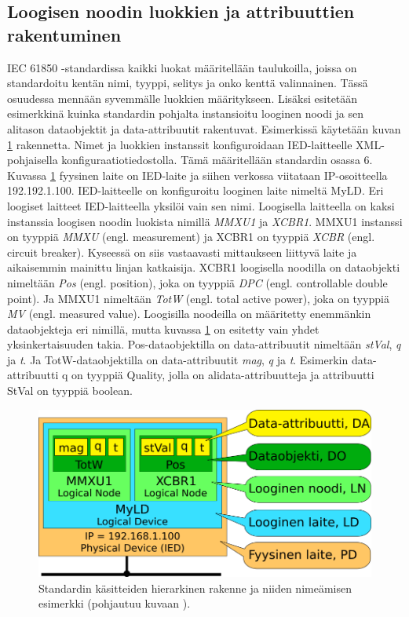 \subsection{Loogisen noodin luokkien ja attribuuttien rakentuminen}
\label{ch:luokkien-rakentuminen-instanseista}
IEC 61850 -standardissa kaikki luokat määritellään taulukoilla, joissa on standardoitu kentän nimi, tyyppi, selitys ja onko kenttä valinnainen. Tässä osuudessa mennään syvemmälle luokkien määritykseen. Lisäksi esitetään esimerkkinä kuinka standardin pohjalta instansioitu looginen noodi ja sen alitason dataobjektit ja data-attribuutit rakentuvat. Esimerkissä käytetään kuvan \ref{fig:iec61850-data-modeling} rakennetta. Nimet ja luokkien instanssit konfiguroidaan IED-laitteelle XML-pohjaisella konfiguraatiotiedostolla. Tämä määritellään standardin osassa 6. Kuvassa \ref{fig:iec61850-data-modeling} fyysinen laite on IED-laite ja siihen verkossa viitataan IP-osoitteella 192.192.1.100. IED-laitteelle on konfiguroitu looginen laite nimeltä MyLD. Eri loogiset laitteet IED-laitteella yksilöi vain sen nimi. Loogisella laitteella on kaksi instanssia loogisen noodin luokista nimillä \emph{MMXU1} ja \emph{XCBR1}. MMXU1 instanssi on tyyppiä \emph{MMXU} (engl. measurement) \mbox{\cite[s.~57--58]{IEC61850-7-4}} ja XCBR1 on tyyppiä \emph{XCBR} (engl. circuit breaker). Kyseessä on siis vastaavasti mittaukseen liittyvä laite ja aikaisemmin mainittu linjan katkaisija. XCBR1 loogisella noodilla on dataobjekti nimeltään \emph{Pos} (engl. position), joka on tyyppiä \emph{DPC} (engl. controllable double point). Ja MMXU1 nimeltään \emph{TotW} (engl. total active power), joka on tyyppiä \emph{MV} (engl. measured value). Loogisilla noodeilla on määritetty enemmänkin dataobjekteja eri nimillä, mutta kuvassa \ref{fig:iec61850-data-modeling} on esitetty vain yhdet yksinkertaisuuden takia. Pos-dataobjektilla on data-attribuutit nimeltään \emph{stVal}, \emph{q} ja \emph{t}. Ja TotW-dataobjektilla on data-attribuutit \emph{mag}, \emph{q} ja \emph{t}. Esimerkin data-attribuutti q on tyyppiä Quality, jolla on alidata-attribuutteja ja attribuutti StVal on tyyppiä boolean.

\begin{figure}[ht!]
	\includegraphics[width=1\textwidth]{pictures/iec61850-data-modeling.png}
	\caption{Standardin käsitteiden hierarkinen rakenne ja niiden nimeämisen esimerkki (pohjautuu kuvaan \mbox{\cite[s.~24]{IEC61850-1}}).}
	\label{fig:iec61850-data-modeling}
\end{figure}


